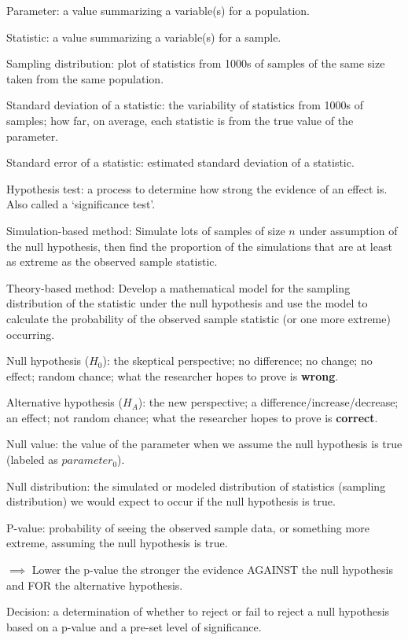 \documentclass[
]{report}
\begin{document}
Parameter: a value summarizing a variable(s) for a population.

Statistic: a value summarizing a variable(s) for a sample.

Sampling distribution: plot of statistics from 1000s of samples of the same size taken from the same population.

Standard deviation of a statistic: the variability of statistics from 1000s of samples; how far, on average, each statistic is from the true value of the parameter.

Standard error of a statistic: estimated standard deviation of a statistic.

Hypothesis test: a process to determine how strong the evidence of an effect is. Also called a `significance test'.

Simulation-based method: Simulate lots of samples of size \(n\) under assumption of the null hypothesis, then find the proportion of the simulations that are at least as extreme as the observed sample statistic.

Theory-based method: Develop a mathematical model for the sampling distribution of the statistic under the null hypothesis and use the model to calculate the probability of the observed sample statistic (or one more extreme) occurring.

Null hypothesis (\(H_0\)): the skeptical perspective; no difference; no change; no effect; random chance; what the researcher hopes to prove is \textbf{wrong}.

Alternative hypothesis (\(H_A\)): the new perspective; a difference/increase/decrease; an effect; not random chance; what the researcher hopes to prove is \textbf{correct}.

Null value: the value of the parameter when we assume the null hypothesis is true (labeled as \(parameter_0\)).

Null distribution: the simulated or modeled distribution of statistics (sampling distribution) we would expect to occur if the null hypothesis is true.

P-value: probability of seeing the observed sample data, or something more extreme, assuming the null hypothesis is true.

\(\implies\) Lower the p-value the stronger the evidence AGAINST the null hypothesis and FOR the alternative hypothesis.

Decision: a determination of whether to reject or fail to reject a null hypothesis based on a p-value and a pre-set level of significance.
\end{document}
